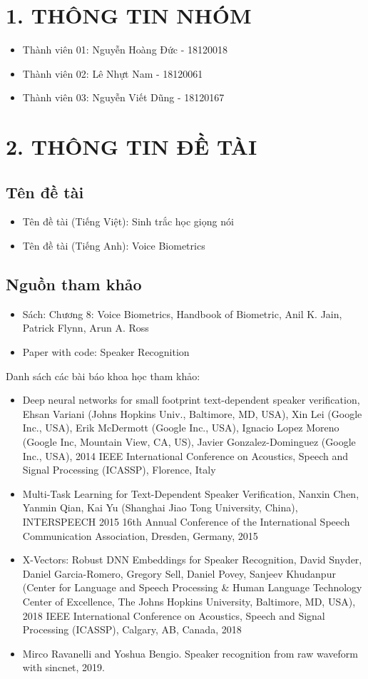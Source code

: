 \documentclass{article}
\begin{document}
	\section{1. THÔNG TIN NHÓM}
	\begin{itemize}
		\item Thành viên 01: Nguyễn Hoàng Đức - 18120018
		\item Thành viên 02: Lê Nhựt Nam - 18120061
		\item Thành viên 03: Nguyễn Viết Dũng - 18120167
	\end{itemize}
	
	\section{2. THÔNG TIN ĐỀ TÀI}
	\subsection{Tên đề tài}
	\begin{itemize}
		\item Tên đề tài (Tiếng Việt): Sinh trắc học giọng nói
		\item Tên đề tài (Tiếng Anh): Voice Biometrics
	\end{itemize}
	\subsection{Nguồn tham khảo}
	\begin{itemize}
		\item Sách: Chương 8: Voice Biometrics, Handbook of Biometric, Anil K. Jain, Patrick Flynn, Arun A.
		Ross
		\item Paper with code: Speaker Recognition
	\end{itemize}
	Danh sách các bài báo khoa học tham khảo:
	\begin{itemize}
		\item Deep neural networks for small footprint text-dependent speaker
		verification, Ehsan Variani (Johns Hopkins Univ., Baltimore, MD, USA), Xin Lei (Google Inc.,
		USA), Erik McDermott (Google Inc., USA), Ignacio Lopez Moreno (Google Inc, Mountain View,
		CA, US), Javier Gonzalez-Dominguez (Google Inc., USA), 2014 IEEE International Conference on Acoustics, Speech and Signal
		Processing (ICASSP), Florence, Italy
		\item Multi-Task Learning for Text-Dependent Speaker Verification, Nanxin Chen, Yanmin Qian, Kai Yu (Shanghai Jiao Tong University, China), INTERSPEECH 2015 16th Annual Conference of the International Speech Communication Association, Dresden, Germany, 2015
		\item X-Vectors: Robust DNN Embeddings for Speaker Recognition, David Snyder, Daniel Garcia-Romero, Gregory Sell, Daniel Povey, Sanjeev Khudanpur (Center for Language and Speech Processing \& Human Language Technology Center of Excellence, The Johns Hopkins University, Baltimore, MD, USA), 2018 IEEE International Conference on Acoustics, Speech and Signal
		Processing (ICASSP), Calgary, AB, Canada, 2018
		\item Mirco Ravanelli and Yoshua Bengio. Speaker recognition from raw waveform with sincnet, 2019.
	\end{itemize}
\end{document}
